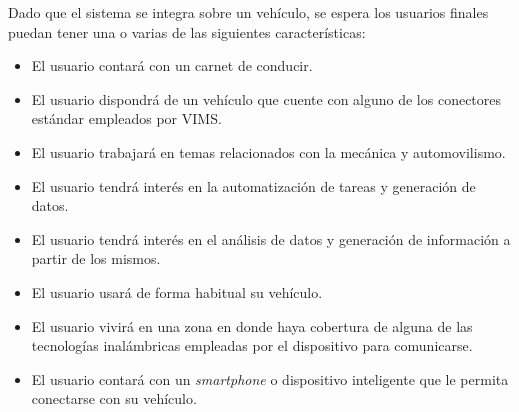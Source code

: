 Dado que el sistema se integra sobre un vehículo, se espera los usuarios finales
puedan tener una o varias de las siguientes características:

\begin{itemize}
  \item El usuario contará con un carnet de conducir.
  \item El usuario dispondrá de un vehículo que cuente con alguno de los 
        conectores estándar empleados por \ac{VIMS}.
  \item El usuario trabajará en temas relacionados con la mecánica y automovilismo.
  \item El usuario tendrá interés en la automatización de tareas y generación de
        datos.
  \item El usuario tendrá interés en el análisis de datos y generación de información
        a partir de los mismos.
  \item El usuario usará de forma habitual su vehículo.
  \item El usuario vivirá en una zona en donde haya cobertura
        de alguna de las tecnologías inalámbricas empleadas por el dispositivo para comunicarse.
  \item El usuario contará con un \textit{smartphone} o dispositivo inteligente que
        le permita conectarse con su vehículo.
\end{itemize}
